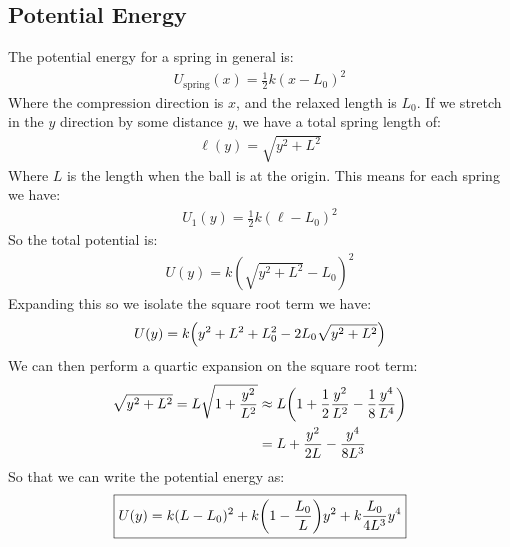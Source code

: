 \subsection{Potential Energy}
The potential energy for a spring in general is:
\begin{align*}
  U_{\text{spring}}(x)=\frac12k(x-L_0)^2
\end{align*}
Where the compression direction is $x$, and the relaxed length is $L_0$. If we stretch in the $y$ direction by some distance $y$, we have a total spring length of:
\begin{align*}
  \ell(y)=\sqrt{y^2+L^2}
\end{align*}
Where $L$ is the length when the ball is at the origin. This means for each spring we have:
\begin{align*}
  U_1(y)=\frac12k(\ell-L_0)^2
\end{align*}
So the total potential is:
\begin{align}
  \boxed{U(y)=k(\sqrt{y^2+L^2}-L_0)^2}
\end{align}
Expanding this so we isolate the square root term we have:
\begin{align*}
  U(y)=k\qty(y^2+L^2+L_0^2-2L_0\sqrt{y^2+L^2})
\end{align*}
We can then perform a quartic expansion on the square root term:
\begin{align*}
  \sqrt{y^2+L^2}=L\sqrt{1+\frac{y^2}{L^2}}
  &\approx L\qty(1+\frac12\frac{y^2}{L^2}-\frac18\frac{y^4}{L^4})\\
  &=L+\frac{y^2}{2L}-\frac{y^4}{8L^3}
\end{align*}
So that we can write the potential energy as:
\begin{align}
  \boxed{U(y)=k(L-L_0)^2+k\qty(1-\frac{L_0}{L})y^2+k\frac{L_0}{4L^3}y^4}
\end{align}

